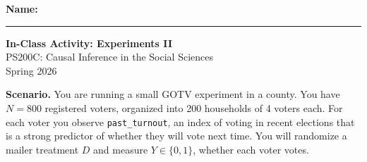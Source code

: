 \documentclass[12pt]{article}
\begin{document}
\noindent
\textbf{Name:} \rule{3in}{0.4pt}

\vspace{0.5cm}

\begin{center}
    {\Large \textbf{In-Class Activity: Experiments II}}\\[0.2cm]
    {\large PS200C: Causal Inference in the Social Sciences}\\
    {\large Spring 2026}
\end{center}

\vspace{0.5cm}

\noindent
\textbf{Scenario.} You are running a small GOTV experiment in a county.
You have $N = 800$ registered voters, organized into 200 households of
4 voters each. For each voter you observe \texttt{past\_turnout}, an
index of voting in recent elections that is a strong predictor of
whether they will vote next time. You will randomize a mailer treatment
$D$ and measure $Y \in \{0,1\}$, whether each voter votes.

\vspace{0.4cm}
\end{document}
